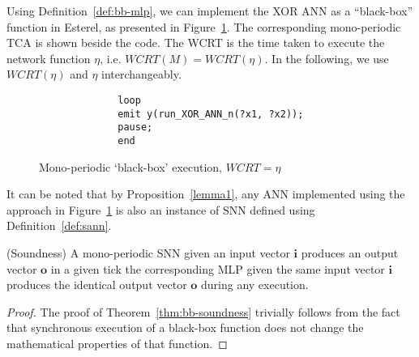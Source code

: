 Using Definition~\ref{def:bb-mlp}, we can implement the XOR \ac{ANN} as a ``black-box'' function in Esterel, as presented in Figure~\ref{fig:tca-bb-n}. 
The corresponding mono-periodic \ac{TCA} is shown beside the code.
The \ac{WCRT} is the time taken to execute the network function
$\eta$, i.e. $WCRT\left(M\right) = WCRT\left( \eta\right)$. 
In the following, we use $WCRT(\eta)$ and $\eta$ interchangeably.

\begin{figure}[H]
	\centering
	\begin{subfigure}[]{0.15\textwidth}
		\centering
		
	\end{subfigure}%
	\begin{subfigure}[]{0.33\textwidth}
		\vspace{3mm}
		\begin{lstlisting}
		loop
		emit y(run_XOR_ANN_n(?x1, ?x2));
		pause;
		end
		\end{lstlisting}
	\end{subfigure}
	\caption{Mono-periodic `black-box' execution, $WCRT = \eta$}
	\label{fig:tca-bb-n}
\end{figure}

It can be noted that by Proposition~\ref{lemma1}, any \ac{ANN} implemented using the approach in Figure~\ref{fig:tca-bb-n} is also an instance of \ac{SNN} defined using Definition~\ref{def:sann}.

\begin{theorem}
	\label{thm:bb-soundness}
	(Soundness) A mono-periodic \ac{SNN} given an input vector $\mathbf{i}$
	produces an output vector $\mathbf{o}$ in a given tick \miff the corresponding \ac{MLP} 
	given the same input vector $\mathbf{i}$ produces the identical output vector $\mathbf{o}$ during any execution.
	
\end{theorem}

\begin{proof}
	The proof of Theorem~\ref{thm:bb-soundness} trivially follows from the
	fact that synchronous execution of a black-box function does not change
	the mathematical properties of that function. %
\end{proof}

